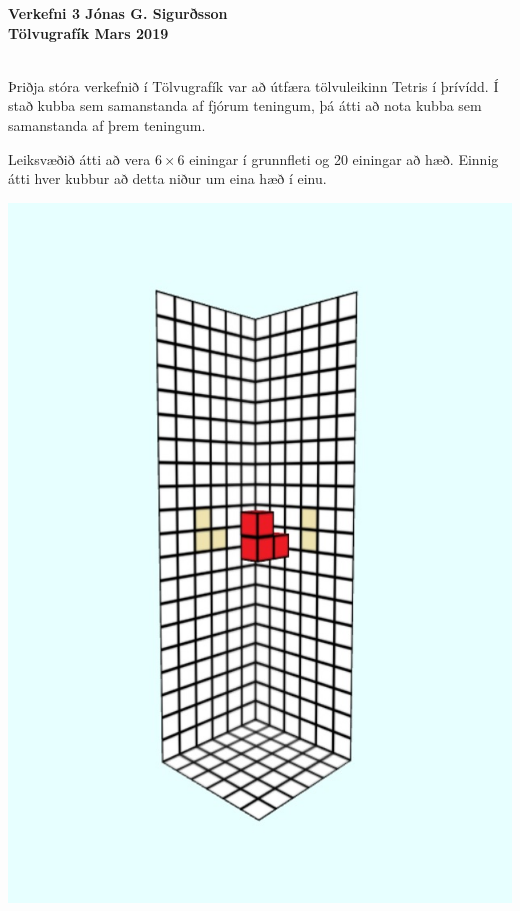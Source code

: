 \documentclass[12pt]{article}
\begin{document}
\noindent \large \textbf{Verkefni 3 \hfill Jónas G. Sigurðsson\\
\noindent Tölvugrafík \hfill 
\normalsize  \hfill Mars 2019}\\\\
\begin{small}

\begin{spacing}{2}
\end{spacing}
Þriðja stóra verkefnið í Tölvugrafík var að útfæra tölvuleikinn Tetris í þrívídd. Í stað kubba sem samanstanda af fjórum teningum, þá átti að nota kubba sem samanstanda af þrem teningum.
\begin{spacing}{2}
\end{spacing}
Leiksvæðið átti að vera $6\times 6$ einingar í grunnfleti og 20 einingar að hæð. Einnig átti hver kubbur að detta niður um eina hæð í einu.
\begin{center}
\includegraphics[scale=0.4]{m1}

\end{center}
\end{small}
\end{document}
